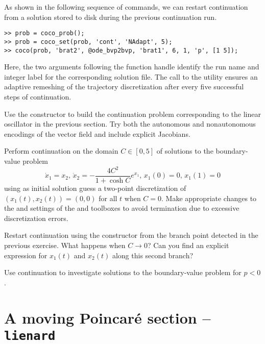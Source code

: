 As shown in the following sequence of commands, we can restart continuation from a solution stored to disk during the previous continuation run. 
\begin{lstlisting}[language=coco-highlight]
>> prob = coco_prob();
>> prob = coco_set(prob, 'cont', 'NAdapt', 5);
>> coco(prob, 'brat2', @ode_bvp2bvp, 'brat1', 6, 1, 'p', [1 5]);
\end{lstlisting}
Here, the two arguments following the  function handle identify the run name and integer label for the corresponding solution file. The call to the  utility ensures an adaptive remeshing of the trajectory discretization after every five successful steps of continuation.
\newline
\begin{exercises}
\item Use the  constructor to build the continuation problem corresponding to the linear oscillator in the previous section. Try both the autonomous and nonautonomous encodings of the vector field and include explicit Jacobians.

\item Perform continuation on the domain $C\in[0,5]$ of solutions to the boundary-value problem
\[
\dot{x}_1=x_2,\,\dot{x}_2=-\frac{4C^2}{1+\cosh C}e^{x_1},\,x_1(0)=0,\,x_1(1)=0
\]
using as initial solution guess a two-point discretization of $(x_1(t),x_2(t))=(0,0)$ for all $t$ when $C=0$. Make appropriate changes to the  and  settings of the  and  toolboxes to avoid termination due to excessive discretization errors.

\item Restart continuation using the  constructor from the branch point detected in the previous exercise. What happens when $C\rightarrow 0$? Can you find an explicit expression for $x_1(t)$ and $x_2(t)$ along this second branch?

\item Use continuation to investigate solutions to the boundary-value problem for $p<0$.
\end{exercises}


\section{A moving Poincar\'{e} section -- \texttt{lienard}}

